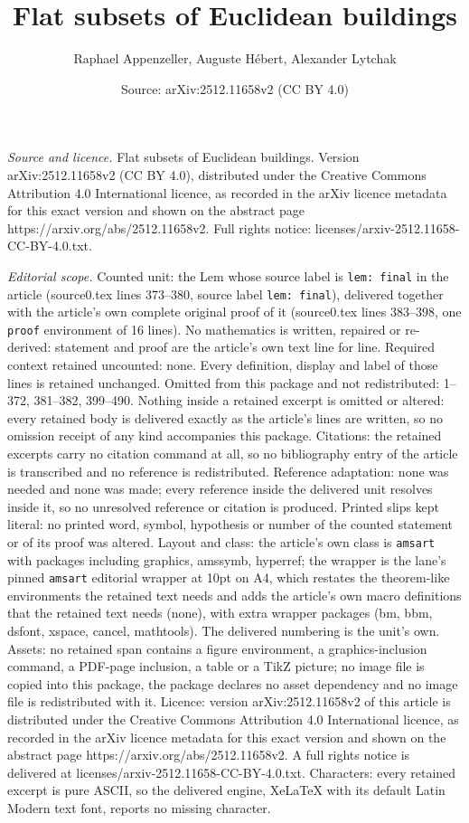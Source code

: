 \documentclass[10pt,a4paper]{amsart}
\title[Flat subsets of Euclidean buildings]{Flat subsets of Euclidean buildings}
\author{Raphael Appenzeller, Auguste H\'ebert, Alexander Lytchak}
\date{Source: arXiv:2512.11658v2 (CC BY 4.0)}
\begin{document}
\maketitle

\noindent\emph{Source and licence.} Flat subsets of Euclidean buildings. Version arXiv:2512.11658v2 (CC BY 4.0), distributed under the Creative Commons Attribution 4.0 International licence, as recorded in the arXiv licence metadata for this exact version and shown on the abstract page https://arxiv.org/abs/2512.11658v2. Full rights notice: licenses/arxiv-2512.11658-CC-BY-4.0.txt.\par\smallskip

\noindent\textit{Editorial scope.} Counted unit: the Lem whose source label is \texttt{lem: final} in the article (source0.tex lines 373--380, source label \texttt{lem: final}), delivered together with the article's own complete original proof of it (source0.tex lines 383--398, one \texttt{proof} environment of 16 lines). No mathematics is written, repaired or re-derived: statement and proof are the article's own text line for line. Required context retained uncounted: none. Every definition, display and label of those lines is retained unchanged. Omitted from this package and not redistributed: 1--372, 381--382, 399--490. Nothing inside a retained excerpt is omitted or altered: every retained body is delivered exactly as the article's lines are written, so no omission receipt of any kind accompanies this package. Citations: the retained excerpts carry no citation command at all, so no bibliography entry of the article is transcribed and no reference is redistributed. Reference adaptation: none was needed and none was made; every reference inside the delivered unit resolves inside it, so no unresolved reference or citation is produced. Printed slips kept literal: no printed word, symbol, hypothesis or number of the counted statement or of its proof was altered. Layout and class: the article's own class is \texttt{amsart} with packages including graphics, amssymb, hyperref; the wrapper is the lane's pinned \texttt{amsart} editorial wrapper at 10pt on A4, which restates the theorem-like environments the retained text needs and adds the article's own macro definitions that the retained text needs (none), with extra wrapper packages (bm, bbm, dsfont, xspace, cancel, mathtools). The delivered numbering is the unit's own. Assets: no retained span contains a figure environment, a graphics-inclusion command, a PDF-page inclusion, a table or a TikZ picture; no image file is copied into this package, the package declares no asset dependency and no image file is redistributed with it. Licence: version arXiv:2512.11658v2 of this article is distributed under the Creative Commons Attribution 4.0 International licence, as recorded in the arXiv licence metadata for this exact version and shown on the abstract page https://arxiv.org/abs/2512.11658v2. A full rights notice is delivered at licenses/arxiv-2512.11658-CC-BY-4.0.txt. Characters: every retained excerpt is pure ASCII, so the delivered engine, XeLaTeX with its default Latin Modern text font, reports no missing character.
\end{document}
